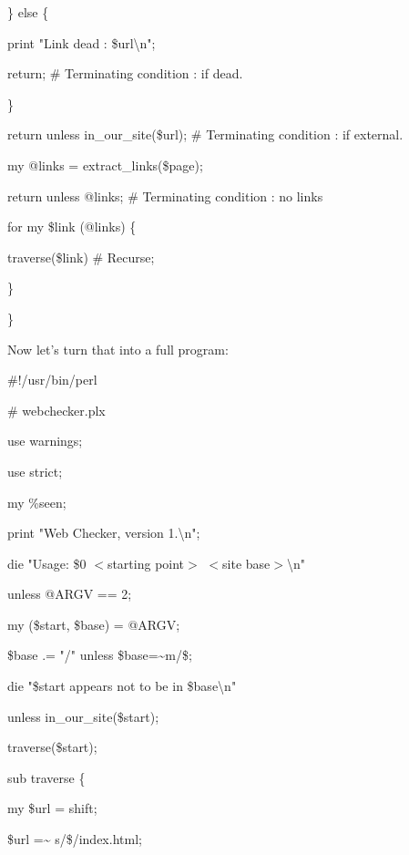 \documentclass[a4paper,11pt]{book}
\begin{document}
\noindent \} else \{

\noindent print "Link dead : \$url\textbackslash n";

\noindent return; \# Terminating condition : if dead.

\noindent \}

\noindent return unless in\_our\_site(\$url); \# Terminating condition : if external.

\noindent my @links = extract\_links(\$page);

\noindent return unless @links; \# Terminating condition : no links

\noindent for my \$link (@links) \{

\noindent traverse(\$link) \# Recurse;

\noindent \}

\noindent \}

\noindent 

\noindent 

\noindent Now let's turn that into a full program:

\noindent 

\noindent \#!/usr/bin/perl

\noindent \# webchecker.plx

\noindent use warnings;

\noindent use strict;

\noindent my \%seen;

\noindent 

\noindent print "Web Checker, version 1.\textbackslash n";

\noindent die "Usage: \$0 $<$starting point$>$ $<$site base$>$\textbackslash n"

\noindent unless @ARGV == 2;

\noindent 

\noindent my (\$start, \$base) = @ARGV;

\noindent \$base .= "/" unless \$base=\~{}m\textbar /\$\textbar ;

\noindent 

\noindent die "\$start appears not to be in \$base\textbackslash n"

\noindent unless in\_our\_site(\$start);

\noindent traverse(\$start);

\noindent 

\noindent sub traverse \{

\noindent my \$url = shift;

\noindent \$url =\~{} s\textbar /\$\textbar /index.html\textbar ;
\end{document}
